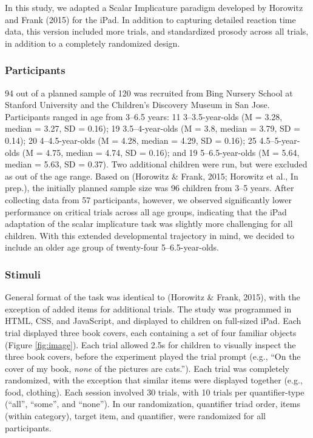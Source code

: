 \documentclass[10pt, letterpaper]{article}
\begin{document}
In this study, we adapted a Scalar Implicature paradigm developed by
Horowitz and Frank (2015) for the iPad. In addition to capturing
detailed reaction time data, this version included more trials, and
standardized prosody across all trials, in addition to a completely
randomized design.

\subsubsection{Participants}\label{participants}

94 out of a planned sample of 120 was recruited from Bing Nursery School
at Stanford University and the Children's Discovery Museum in San Jose.
Participants ranged in age from 3--6.5 years: 11 3--3.5-year-olds (M =
3.28, median = 3.27, SD = 0.16); 19 3.5--4-year-olds (M = 3.8, median =
3.79, SD = 0.14); 20 4--4.5-year-olds (M = 4.28, median = 4.29, SD =
0.16); 25 4.5--5-year-olds (M = 4.75, median = 4.74, SD = 0.16); and 19
5--6.5-year-olds (M = 5.64, median = 5.63, SD = 0.37). Two additional
children were run, but were excluded as out of the age range. Based on
(Horowitz \& Frank, 2015; Horowitz et al., In prep.), the initially
planned sample size was 96 children from 3--5 years. After collecting
data from 57 participants, however, we observed significantly lower
performance on critical trials across all age groups, indicating that
the iPad adaptation of the scalar implicature task was slightly more
challenging for all children. With this extended developmental
trajectory in mind, we decided to include an older age group of
twenty-four 5--6.5-year-olds.

\subsubsection{Stimuli}\label{stimuli}

General format of the task was identical to (Horowitz \& Frank, 2015),
with the exception of added items for additional trials. The study was
programmed in HTML, CSS, and JavaScript, and displayed to children on
full-sized iPad. Each trial displayed three book covers, each containing
a set of four familiar objects (Figure \ref{fig:image}). Each trial
allowed 2.5s for children to visually inspect the three book covers,
before the experiment played the trial prompt (e.g., ``On the cover of
my book, \emph{none} of the pictures are cats.''). Each trial was
completely randomized, with the exception that similar items were
displayed together (e.g., food, clothing). Each session involved 30
trials, with 10 trials per quantifier-type (``all'', ``some'', and
``none''). In our randomization, quantifier triad order, items (within
category), target item, and quantifier, were randomized for all
participants.
\end{document}
